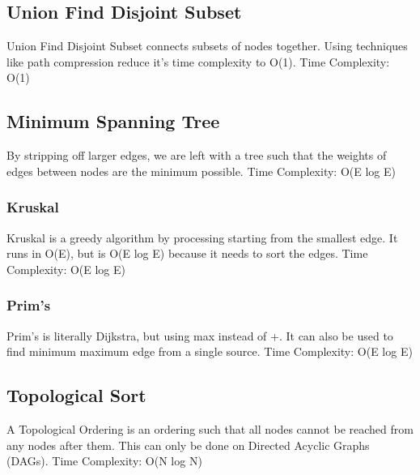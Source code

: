 \documentclass{article}
\begin{document}
\subsection{Union Find Disjoint Subset}
\begin{flushleft}
Union Find Disjoint Subset connects subsets of nodes together.
Using techniques like path compression reduce it's time complexity to O(1).
\newline
Time Complexity: O(1)
\end{flushleft}


\subsection{Minimum Spanning Tree}
\begin{flushleft}
By stripping off larger edges, we are left with a tree such that
the weights of edges between nodes are the minimum possible.
\newline
Time Complexity: O(E log E)
\end{flushleft}

\subsubsection{Kruskal}
\begin{flushleft}
Kruskal is a greedy algorithm by processing starting from the smallest edge.
It runs in O(E), but is O(E log E) because it needs to sort the edges.
\newline
Time Complexity: O(E log E)
\end{flushleft}


\subsubsection{Prim's}
\begin{flushleft}
Prim's is literally Dijkstra, but using max instead of +.
It can also be used to find minimum maximum edge from a single source.
\newline
Time Complexity: O(E log E)
\end{flushleft}


\subsection{Topological Sort}
\begin{flushleft}
A Topological Ordering is an ordering such that all nodes cannot be reached from any nodes after them.
This can only be done on Directed Acyclic Graphs (DAGs).
\newline
Time Complexity: O(N log N)
\end{flushleft}

\end{document}
